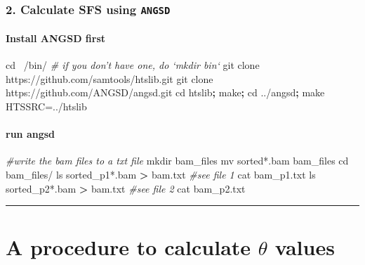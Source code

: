 \documentclass[]{article}
\newenvironment{Shaded}{\begin{snugshade}}{\end{snugshade}}
\newcommand{\BuiltInTok}[1]{#1}
\newcommand{\CommentTok}[1]{\textcolor[rgb]{0.56,0.35,0.01}{\textit{#1}}}
\newcommand{\FunctionTok}[1]{\textcolor[rgb]{0.00,0.00,0.00}{#1}}
\newcommand{\KeywordTok}[1]{\textcolor[rgb]{0.13,0.29,0.53}{\textbf{#1}}}
\newcommand{\NormalTok}[1]{#1}
\newcommand{\OperatorTok}[1]{\textcolor[rgb]{0.81,0.36,0.00}{\textbf{#1}}}
\let\oldparagraph\paragraph
\renewcommand{\paragraph}[1]{\oldparagraph{#1}\mbox{}}
\begin{document}
\hypertarget{calculate-sfs-using-angsd}{%
\subsubsection{\texorpdfstring{2. Calculate SFS using
\texttt{ANGSD}}{2. Calculate SFS using ANGSD}}\label{calculate-sfs-using-angsd}}

\hypertarget{install-angsd-first}{%
\paragraph{Install ANGSD first}\label{install-angsd-first}}

\begin{Shaded}
\begin{Highlighting}[]
\BuiltInTok{cd}\NormalTok{ ~/bin/ }\CommentTok{# if you don't have one, do `mkdir bin`}
\FunctionTok{git}\NormalTok{ clone https://github.com/samtools/htslib.git}
\FunctionTok{git}\NormalTok{ clone https://github.com/ANGSD/angsd.git }
\BuiltInTok{cd}\NormalTok{ htslib}\KeywordTok{;} \FunctionTok{make}\KeywordTok{;} 
\BuiltInTok{cd}\NormalTok{ ../angsd}\KeywordTok{;}
\FunctionTok{make}\NormalTok{ HTSSRC=../htslib}
\end{Highlighting}
\end{Shaded}

\hypertarget{run-angsd}{%
\paragraph{run angsd}\label{run-angsd}}

\begin{Shaded}
\begin{Highlighting}[]
\CommentTok{#write the bam files to a txt file}
\FunctionTok{mkdir}\NormalTok{ bam_files}
\FunctionTok{mv}\NormalTok{ sorted*.bam bam_files}
\BuiltInTok{cd}\NormalTok{ bam_files/}
\FunctionTok{ls}\NormalTok{ sorted_p1*.bam }\OperatorTok{>}\NormalTok{ bam.txt}
\CommentTok{#see file 1}
\FunctionTok{cat}\NormalTok{ bam_p1.txt }
\FunctionTok{ls}\NormalTok{ sorted_p2*.bam }\OperatorTok{>}\NormalTok{ bam.txt}
\CommentTok{#see file 2}
\FunctionTok{cat}\NormalTok{ bam_p2.txt }
\end{Highlighting}
\end{Shaded}

\begin{center}\rule{0.5\linewidth}{0.5pt}\end{center}

\hypertarget{a-procedure-to-calculate-theta-values-1}{%
\section{\texorpdfstring{A procedure to calculate \(\theta\)
values}{A procedure to calculate \textbackslash{}theta values}}\label{a-procedure-to-calculate-theta-values-1}}
\end{document}
